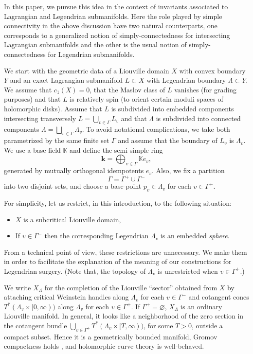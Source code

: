 \documentclass{gtpart}
\renewcommand{\k}{\mathbf{k}}
\begin{document}
In this paper, we pursue this idea in the context of invariants
associated to Lagrangian and Legendrian submanifolds. Here the role played by simple connectivity in the above discussion have two natural counterparts, one corresponds to a generalized notion of simply-connectedness for intersecting Lagrangian submanifolds and the other is the usual notion of simply-connectedness for Legendrian submanifolds. 

We start with the geometric data of a Liouville domain $X$ with convex boundary $Y$ and an exact Lagrangian submanifold $L \subset X$ with Legendrian boundary $\Lambda \subset Y$. We assume that $c_{1}(X)=0$, that the Maslov class of $L$ vanishes (for grading purposes) and that $L$ is relatively spin (to orient certain moduli spaces of holomorphic disks). 
Assume that $L$ is subdivided into embedded components intersecting transversely $L = \bigcup_{v \in \Gamma} L_v$ and that $\Lambda$ is subdivided into connected components $\Lambda =
\bigsqcup_{v \in \Gamma} \Lambda_v$. To avoid notational complications, we take both parametrized by the same finite set $\Gamma$ and assume that the boundary of $L_v$ is $\Lambda_v$. We use a base field $\mathbb{K}$ and define the semi-simple 
ring
\[ 
\k = \bigoplus_{v \in \Gamma} \mathbb{K} e_v, 
\]  
generated by mutually orthogonal idempotents $e_v$. Also, we fix a partition 
\[ 
\Gamma = \Gamma^{+} \cup \Gamma^{-} 
\]
into two disjoint sets, and choose a base-point $p_v \in \Lambda_v$ for each $v \in \Gamma^{+}$. 

For simplicity, let us restrict, in this introduction, to the following situation: 
\begin{itemize}
    \item $X$ is a subcritical Liouville domain, 
    \item If $v \in \Gamma^{-}$ then the corresponding
Legendrian $\Lambda_v$ is an embedded \emph{sphere}. 
\end{itemize} 
From a technical point of view, these restrictions are unnecessary. We make them in order to facilitate the explanation of the meaning of our constructions for Legendrian surgery. (Note that, the topology of $\Lambda_v$ is unrestricted when $v \in \Gamma^{+}$.) 

We write $X_{\Lambda}$ for the completion of the Liouville ``sector'' obtained from $X$ by attaching critical Weinstein
handles along $\Lambda_v$ for each $v \in \Gamma^-$ and cotangent cones $T^*(\Lambda_v
\times [0,\infty))$ along $\Lambda_v$ for each $v \in
\Gamma^+$. If $\Gamma^+= \varnothing$, $X_\Lambda$ is an ordinary Liouville manifold. In general, it looks like a neighborhood of the zero section in the cotangent bundle $\bigcup_{v\in\Gamma^{+}} T^{\ast}(\Lambda_{v}\times [T,\infty))$, for some $T>0$, outside a compact subset. Hence it is a geometrically bounded manifold, Gromov compactness holds \cite{Gromov}, and holomorphic curve theory is well-behaved. 
\end{document}
